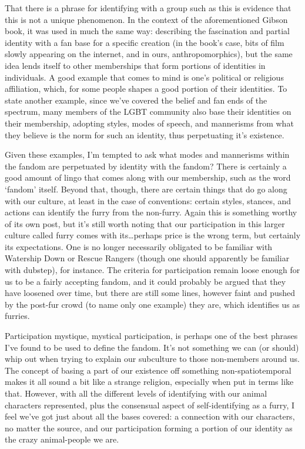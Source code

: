 That there is a phrase for identifying with a group such as this is evidence that this is not a unique phenomenon. In the context of the aforementioned Gibson book, it was used in much the same way: describing the fascination and partial identity with a fan base for a specific creation (in the book's case, bits of film slowly appearing on the internet, and in ours, anthropomorphics), but the same idea lends itself to other memberships that form portions of identities in individuals. A good example that comes to mind is one's political or religious affiliation, which, for some people shapes a good portion of their identities. To state another example, since we've covered the belief and fan ends of the spectrum, many members of the LGBT community also base their identities on their membership, adopting styles, modes of speech, and mannerisms from what they believe is the norm for such an identity, thus perpetuating it's existence.

Given these examples, I'm tempted to ask what modes and mannerisms within the fandom are perpetuated by identity with the fandom? There is certainly a good amount of lingo that comes along with our membership, such as the word ‘fandom' itself. Beyond that, though, there are certain things that do go along with our culture, at least in the case of conventions: certain styles, stances, and actions can identify the furry from the non-furry.  Again this is something worthy of its own post, but it's still worth noting that our participation in this larger culture called furry comes with its…perhaps price is the wrong term, but certainly its expectations.  One is no longer necessarily obligated to be familiar with Watership Down or Rescue Rangers (though one should apparently be familiar with dubstep), for instance.  The criteria for participation remain loose enough for us to be a fairly accepting fandom, and it could probably be argued that they have loosened over time, but there are still some lines, however faint and pushed by the post-fur crowd (to name only one example) they are, which identifies us as furries.

Participation mystique, mystical participation, is perhaps one of the best phrases I've found to be used to define the fandom.  It's not something we can (or should) whip out when trying to explain our subculture to those non-members around us.  The concept of basing a part of our existence off something non-spatiotemporal makes it all sound a bit like a strange religion, especially when put in terms like that.  However, with all the different levels of identifying with our animal characters represented, plus the consensual aspect of self-identifying as a furry, I feel we've got just about all the bases covered: a connection with our characters, no matter the source, and our participation forming a portion of our identity as the crazy animal-people we are.
